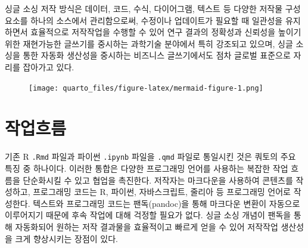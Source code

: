 \documentclass[
  letterpaper,
]{book}
\begin{document}
싱글 소싱 저작 방식은 데이터, 코드, 수식, 다이어그램, 텍스트 등 다양한
저작물 구성요소를 하나의 소스에서 관리함으로써, 수정이나 업데이트가
필요할 때 일관성을 유지하면서 효율적으로 저작작업을 수행할 수 있어 연구
결과의 정확성과 신뢰성을 높이기 위한 재현가능한 글쓰기를 중시하는
과학기술 분야에서 특히 강조되고 있으며, 싱글 소싱을 통한 자동화 생산성을
중시하는 비즈니스 글쓰기에서도 점차 글로벌 표준으로 자리를 잡아가고
있다.

\begin{figure}[H]

{\centering \texttt{[image: quarto\_files/figure-latex/mermaid-figure-1.png]}

}

\end{figure}

\hypertarget{uxc791uxc5c5uxd750uxb984}{%
\section{작업흐름}\label{uxc791uxc5c5uxd750uxb984}}

기존 R \texttt{.Rmd} 파일과 파이썬 \texttt{.ipynb} 파일을 \texttt{.qmd}
파일로 통일시킨 것은 쿼토의 주요 특징 중 하나이다. 이러한 통합은 다양한
프로그래밍 언어를 사용하는 복잡한 작업 흐름을 단순화시킬 수 있고 협업을
촉진한다. 저작자는 마크다운을 사용하여 콘텐츠를 작성하고, 프로그래밍
코드는 R, 파이썬, 자바스크립트, 줄리아 등 프로그래밍 언어로 작성한다.
텍스트와 프로그래밍 코드는 팬독(pandoc)을 통해 마크다운 변환이 자동으로
이루어지기 때문에 후속 작업에 대해 걱정할 필요가 없다. 싱글 소싱 개념이
팬독을 통해 자동화되어 원하는 저작 결과물을 효율적이고 빠르게 얻을 수
있어 저작작업 생산성을 크게 향상시키는 장점이 있다.
\end{document}
